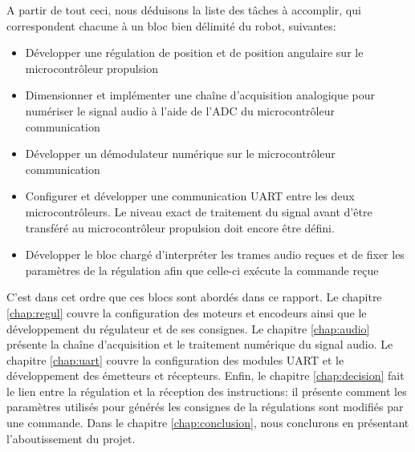 A partir de tout ceci, nous déduisons la liste des tâches à accomplir, qui correspondent chacune à un bloc bien délimité du robot, suivantes:
\begin{itemize}
  \item Développer une régulation de position et de position angulaire sur le microcontrôleur propulsion
  \item Dimensionner et implémenter une chaîne d'acquisition analogique pour numériser le signal audio à l'aide de l'ADC du microcontrôleur communication
  \item Développer un démodulateur numérique sur le microcontrôleur communication
  \item Configurer et développer une communication UART entre les deux microcontrôleurs. Le niveau exact de traitement du signal avant d'être transféré au microcontrôleur propulsion doit encore être défini.
  \item Développer le bloc chargé d'interpréter les trames audio reçues et de fixer les paramètres de la régulation afin que celle-ci exécute la commande reçue
\end{itemize}

C'est dans cet ordre que ces blocs sont abordés dans ce rapport. Le chapitre \ref{chap:regul} couvre la configuration des moteurs et encodeurs ainsi que le développement du régulateur et de ses consignes. Le chapitre \ref{chap:audio} présente la chaîne d'acquisition et le traitement numérique du signal audio. Le chapitre \ref{chap:uart} couvre la configuration des modules UART et le développement des émetteurs et récepteurs. Enfin, le chapitre \ref{chap:decision} fait le lien entre la régulation et la réception des instructions: il présente comment les paramètres utilisés pour générés les consignes de la régulations sont modifiés par une commande. Dans le chapitre \ref{chap:conclusion}, nous conclurons en présentant l'aboutissement du projet.
